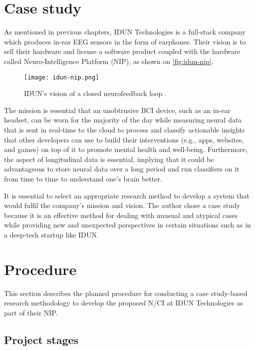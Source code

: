 \section{Case study}
\label{chapter3-case-study}

As mentioned in previous chapters, IDUN Technologies is a full-stack company which produces in-ear EEG sensors in the form of earphones. Their vision is to sell their hardware and license a software product coupled with the hardware called Neuro-Intelligence Platform (NIP), as shown on \autoref{fig:idun-nip}.

\begin{figure}[!ht]
  \centering
  \texttt{[image: idun-nip.png]}
  \caption{IDUN's vision of a closed neurofeedback loop \citep{idun_guardian_nodate}.}
  \label{fig:idun-nip}
\end{figure}

The mission is essential that an unobtrusive BCI device, such as an in-ear headset, can be worn for the majority of the day while measuring neural data that is sent in real-time to the cloud to process and classify actionable insights that other developers can use to build their interventions (e.g., apps, websites, and games) on top of it to promote mental health and well-being. Furthermore, the aspect of longitudinal data is essential, implying that it could be advantageous to store neural data over a long period and run classifiers on it from time to time to understand one's brain better.

It is essential to select an appropriate research method to develop a system that would fulfil the company's mission and vision. The author chose a case study because it is an effective method for dealing with unusual and atypical cases while providing new and unexpected perspectives in certain situations such as in a deep-tech startup like IDUN.

\section{Procedure}
\label{chapter3-procedure}

This section describes the planned procedure for conducting a case study-based research methodology to develop the proposed N/CI at IDUN Technologies as part of their NIP.

\subsection{Project stages}
\label{chapter3-project-stages}

